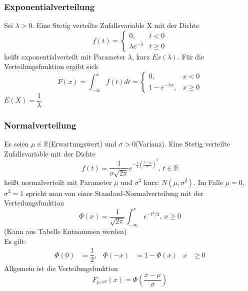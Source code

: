 \documentclass[
	ngerman,
	accentcolor=9c,%
	type=intern,
	marginpar=false
	]{tudapub}
\begin{document}
                \subsubsection*{Exponentialverteilung}
                    Sei $\lambda > 0$. Eine Stetig verteilte Zufallsvariable X mit der Dichte
                    \begin{equation*}
                        f(t)=
                        \begin{cases}
                            0, & t < 0\\
                            \lambda e^{-\lambda } & t \geq 0
                        \end{cases}
                    \end{equation*}
                    heißt exponentialverteilt mit Parameter $\lambda$, kurz $Ex(\lambda)$.
                    Für die Verteilungsfunktion ergibt sich
                    \begin{equation*}
                        F(x)=\int_{-\infty}^x f(t) dt = 
                        \begin{cases}
                            0,& x <0\\
                            1-e^{-\lambda x}, & x \geq 0
                        \end{cases}
                    \end{equation*}
                    $E(X) = \dfrac{1}{\lambda}$
                \subsubsection*{Normalverteilung}
                    Es seien $\mu \in \mathbb{R}$(Erwartungswert) und $\sigma > 0$(Varianz). Eine Stetig verteilte Zufallsvariable mit der Dichte
                    \begin{equation*}
                        f(t)= \dfrac{1}{\sigma \sqrt{2 \pi}}e^{-\frac{1}{2}(\frac{t- \mu}{\sigma})^2}\mbox{, }t \in \mathbb{R}
                    \end{equation*}
                    heißt normalverteilt mit Parameter $\mu$ und $\sigma^2$ kurz: $N(\mu, \sigma^2)$.
                    Im Falle $\mu = 0$, $\sigma^2 =1$ spricht man von einer Standard-Normalverteilung mit der Verteilungsfunktion
                    \begin{equation*}
                        \Phi(x) = \frac{1}{\sqrt{2 \pi}}\int_{-\infty}^x e^{-t^2/2}\mbox{, } x \geq 0
                    \end{equation*}
                    (Kann aus Tabelle Entnommen werden)\\
                    Es gilt:
                    \begin{align*}
                        \Phi(0) &= \dfrac{1}{2}, & \Phi(-x) &= 1- \Phi(x) & x &\geq 0
                    \end{align*}
                    Allgemein ist die Verteilungsfunktion
                    \begin{equation*}
                        F_{\mu, \sigma^2}(x) = \Phi(\dfrac{x-\mu}{\sigma})
                    \end{equation*}
\end{document}
